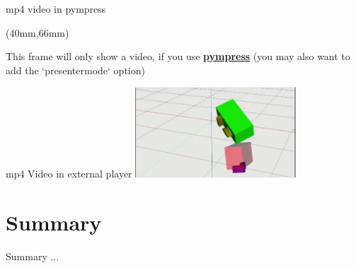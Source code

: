 \documentclass[student, noshadow, lsr, english, aspectratio=169]{ITR_LSR_slides}
\begin{document}
	\begin{frame}{mp4 video in pympress}
		\begin{textblock*}{90mm}(40mm,66mm) 
			\begin{tcolorbox}\color{tum_blue}
				\centering
				This frame will only show a video, if you use 
				\href{https://pympress.readthedocs.io/en/latest/README.html}{\textbf{pympress}}
				 (you may also want to add the `presentermode` option)
			\end{tcolorbox}
		\end{textblock*}
	\end{frame}
	
	\begin{frame}{mp4 Video in external player}	 
		\href{run:movie/OTG_simulation.mp4}{
			\includegraphics[width=6cm,keepaspectratio]{movie/OTG_simulation.png}
		}
	\end{frame}
	
\section{Summary}

\begin{frame}{Summary}
	...
\end{frame}

	\appendix
	\CheckAttentionSlide


\begin{frame}{\LSRITRRefTitle}
	\printbibliography
\end{frame}
\end{document}
